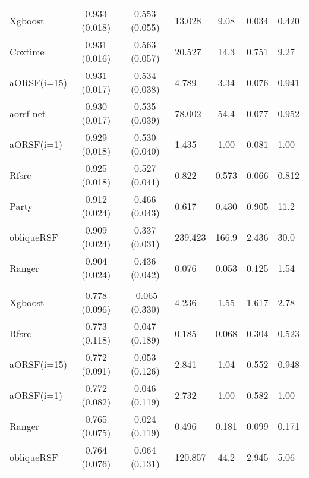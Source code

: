 \documentclass[twoside,11pt]{article}\usepackage[]{graphicx}\usepackage[]{color}
\newenvironment{knitrout}{}{} %
\begin{document}
\begin{knitrout}
\begin{longtable}{lcclccl}
\addlinespace[0.3em]
\hline
\multicolumn{7}{l}{\textit{\textbf{time-to-million}}}\\
\hline
\hspace{1em}Xgboost & 0.933 (0.018) & 0.553 (0.055) & 13.028 & 9.08 & 0.034 & 0.420\\
\hspace{1em}Coxtime & 0.931 (0.016) & 0.563 (0.057) & 20.527 & 14.3 & 0.751 & 9.27\\
\hspace{1em}aORSF(i=15) & 0.931 (0.017) & 0.534 (0.038) & 4.789 & 3.34 & 0.076 & 0.941\\
\hspace{1em}aorsf-net & 0.930 (0.017) & 0.535 (0.039) & 78.002 & 54.4 & 0.077 & 0.952\\
\hspace{1em}aORSF(i=1) & 0.929 (0.018) & 0.530 (0.040) & 1.435 & 1.00 & 0.081 & 1.00\\
\hspace{1em}Rfsrc & 0.925 (0.018) & 0.527 (0.041) & 0.822 & 0.573 & 0.066 & 0.812\\
\hspace{1em}Party & 0.912 (0.024) & 0.466 (0.043) & 0.617 & 0.430 & 0.905 & 11.2\\
\hspace{1em}obliqueRSF & 0.909 (0.024) & 0.337 (0.031) & 239.423 & 166.9 & 2.436 & 30.0\\
\hspace{1em}Ranger & 0.904 (0.024) & 0.436 (0.042) & 0.076 & 0.053 & 0.125 & 1.54\\
\addlinespace[0.3em]
\hline
\multicolumn{7}{l}{\textit{\textbf{vdv}}}\\
\hline
\hspace{1em}Xgboost & 0.778 (0.096) & -0.065 (0.330) & 4.236 & 1.55 & 1.617 & 2.78\\
\hspace{1em}Rfsrc & 0.773 (0.118) & 0.047 (0.189) & 0.185 & 0.068 & 0.304 & 0.523\\
\hspace{1em}aORSF(i=15) & 0.772 (0.091) & 0.053 (0.126) & 2.841 & 1.04 & 0.552 & 0.948\\
\hspace{1em}aORSF(i=1) & 0.772 (0.082) & 0.046 (0.119) & 2.732 & 1.00 & 0.582 & 1.00\\
\hspace{1em}Ranger & 0.765 (0.075) & 0.024 (0.119) & 0.496 & 0.181 & 0.099 & 0.171\\
\hspace{1em}obliqueRSF & 0.764 (0.076) & 0.064 (0.131) & 120.857 & 44.2 & 2.945 & 5.06\\

\end{longtable}
\end{knitrout}
\end{document}
